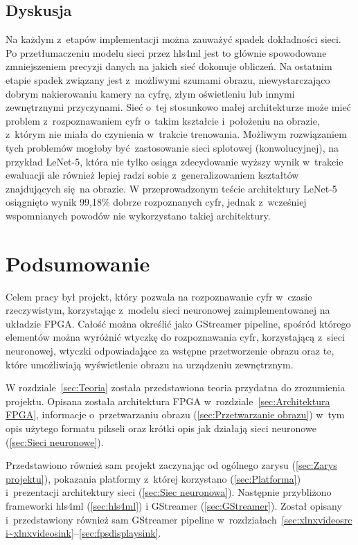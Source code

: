\documentclass[12pt, oneside, a4paper]{article}
\begin{document}
\subsection{Dyskusja}\label{sec:Dyskusja}
Na każdym z~etapów implementacji można zauważyć spadek dokładności sieci.
Po przetłumaczeniu modelu sieci przez hls4ml jest to głównie spowodowane
zmniejszeniem precyzji danych na jakich sieć dokonuje obliczeń. 
Na ostatnim etapie spadek związany jest z~możliwymi szumami obrazu,
niewystarczająco dobrym nakierowaniu kamery na cyfrę, złym oświetleniu lub
innymi zewnętrznymi przyczynami. Sieć o~tej stosunkowo małej architekturze
może mieć problem z~rozpoznawaniem cyfr o~takim kształcie i~położeniu
na obrazie, z~którym nie miała do czynienia w~trakcie trenowania.
Możliwym rozwiązaniem tych problemów mogłoby być zastosowanie sieci
splotowej (konwolucyjnej), na przykład \mbox{LeNet-5}, która nie tylko
osiąga zdecydowanie wyższy wynik w~trakcie ewaluacji ale również lepiej
radzi sobie z~generalizowaniem kształtów znajdujących się na obrazie.
W przeprowadzonym teście architektury \mbox{LeNet-5} osiągnięto wynik
99,18\% dobrze rozpoznanych cyfr, jednak z~wcześniej
wspomnianych powodów nie wykorzystano takiej architektury.


\newpage
{}
\section*{Podsumowanie}
%
Celem pracy był projekt, który pozwala na
rozpoznawanie cyfr w~czasie rzeczywistym, korzystając z~modelu sieci
neuronowej zaimplementowanej na układzie FPGA. Całość można określić jako
GStreamer pipeline, spośród którego elementów można wyróżnić wtyczkę
do rozpoznawania cyfr, korzystającą z~sieci neuronowej, wtyczki odpowiadające
za wstępne przetworzenie obrazu oraz te, które umożliwiają wyświetlenie obrazu
na urządzeniu zewnętrznym.

W rozdziale~\ref{sec:Teoria} została przedstawiona teoria przydatna
do zrozumienia projektu. Opisana została architektura FPGA
w~rozdziale~\ref{sec:Architektura FPGA}, informacje o~przetwarzaniu
obrazu (\ref{sec:Przetwarzanie obrazu}) w~tym opis użytego formatu pikseli
oraz krótki opis jak działają sieci neuronowe (\ref{sec:Sieci neuronowe}).

Przedstawiono również sam projekt zaczynając od ogólnego
zarysu (\ref{sec:Zarys projektu}), pokazania platformy z~której korzystano
(\ref{sec:Platforma}) i~prezentacji architektury sieci (\ref{sec:Siec neuronowa}).
Następnie przybliżono frameworki hls4ml (\ref{sec:hls4ml})
i GStreamer (\ref{sec:GStreamer}). Został opisany i~przedstawiony
również sam GStreamer pipeline
w~rozdziałach~\ref{sec:xlnxvideosrc i~xlnxvideosink}--\ref{sec:fpsdisplaysink}.
\end{document}
